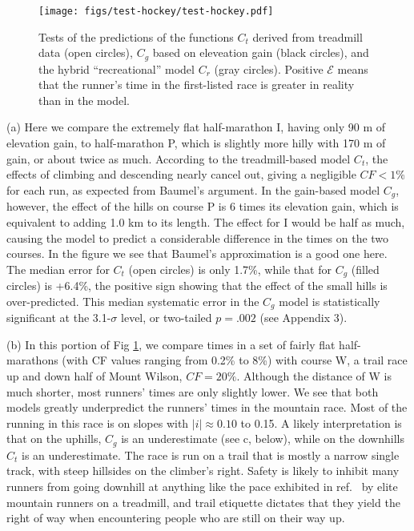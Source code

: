\documentclass[10pt,letterpaper]{article}
\begin{document}
\begin{figure}[h]
\texttt{[image: figs/test-hockey/test-hockey.pdf]}
\centering
\caption{Tests of the predictions of the functions $C_t$ derived from treadmill data (open circles),
$C_g$ based on eleveation gain (black circles), and the hybrid ``recreational'' model
$C_r$ (gray circles). Positive $\mathcal{E}$ means that the runner's
time in the first-listed race is greater in reality than in the model.
}
\label{fig:test-hockey}
\end{figure}

(a) Here we compare the extremely flat half-marathon I, having only 90 m of elevation gain,
to half-marathon P, which is slightly more hilly with 170 m of gain, or about twice as much.
According to the treadmill-based model $C_t$, the effects of climbing and descending
nearly cancel out, giving a negligible $CF<1\%$ for each run, as expected from Baumel's argument.
In the gain-based model $C_g$, however, the effect of the hills on course P is
6 times its elevation gain, which is equivalent to adding 1.0 km to its length. The effect for I would
be half as much, causing the model to predict a considerable difference in the times on
the two courses. In the figure we see that Baumel's approximation is a good one here. The median
error for $C_t$ (open circles) is only 1.7\%, while that for $C_g$ (filled circles) is +6.4\%,
the positive sign showing that the effect of the small hills is over-predicted.
This median systematic error in the $C_g$ model is statistically significant
at the 3.1-$\sigma$ level, or two-tailed $p=.002$ (see Appendix 3).


(b) In this portion of Fig \ref{fig:test-hockey}, we compare times in a set of fairly flat half-marathons
(with CF values ranging from 0.2\% to 8\%) with course W, a trail race up and down half of Mount Wilson, $CF=20\%$.
Although the distance of W is much shorter, most runners' times are only slightly lower. We see that both
models greatly underpredict the runners' times in the mountain race. Most of the running in this race is
on slopes with $|i|\approx 0.10$ to 0.15. A likely interpretation is that on the uphills, $C_g$ is an
underestimate (see c, below), while on the downhills $C_t$ is an underestimate. The race is run on a trail that is
mostly a narrow single track, with steep hillsides on the climber's right. Safety is likely to inhibit
many runners from going downhill at anything like the pace exhibited in ref.~\cite{minetti} by elite mountain runners
on a treadmill, and trail etiquette dictates that they yield the right of way when encountering
people who are still on their way up.
\end{document}
